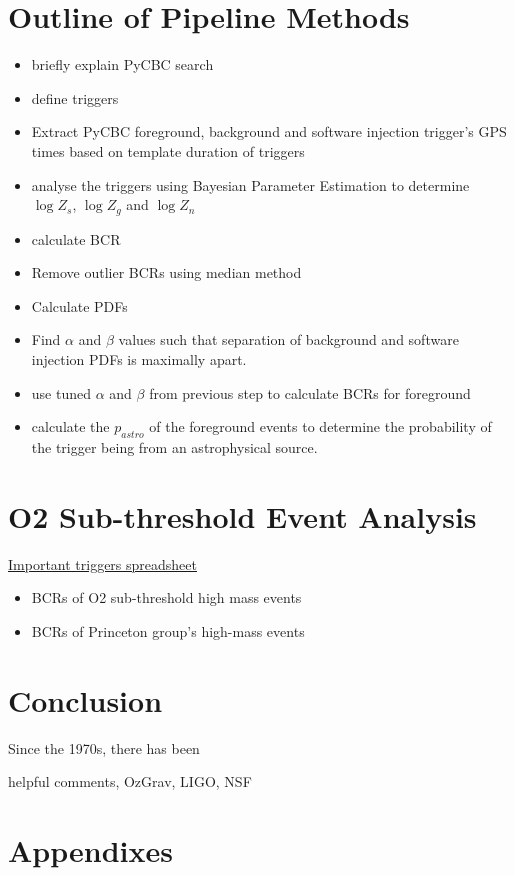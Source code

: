 \documentclass[%
 reprint,
 amsmath,amssymb,
 aps,
]{revtex4-2}
\begin{document}
\section{\label{sec:OutlineOfPipelineMethods}Outline of Pipeline Methods}

\begin{itemize}
    \item briefly explain PyCBC search
    \item define triggers
    \item Extract PyCBC foreground, background and software injection trigger's GPS times based on template duration of triggers
    \item analyse the triggers using Bayesian Parameter Estimation to determine $\log{Z_s}$, $\log{Z_g}$ and $\log{Z_n}$
    \item calculate BCR
    \item Remove outlier BCRs using median method
    \item Calculate PDFs
    \item Find $\alpha$ and $\beta$ values such that separation of background and software injection PDFs is maximally apart.
    \item use tuned $\alpha$ and $\beta$ from previous step to calculate BCRs for foreground
    \item calculate the $p_{astro}$ of the foreground events to determine the probability of the trigger being from an astrophysical source. 
\end{itemize}


\section{\label{sec:Analysis}O2 Sub-threshold Event Analysis}
\hyperlink{https://docs.google.com/spreadsheets/d/1hm7lFsYneY8NGbFDr-vH5YYsILrxcTexO9D1AvF1qJo/edit?usp=sharing}{Important triggers spreadsheet}
\begin{itemize}
    \item BCRs of O2 sub-threshold high mass events
    \item BCRs of Princeton group's high-mass  events
\end{itemize}


\section{\label{sec:Conclusion}Conclusion}
Since the 1970s, there has been 

\begin{acknowledgments}
helpful comments, OzGrav, LIGO, NSF

\end{acknowledgments}

\appendix
\section{Appendixes}


\end{document}
